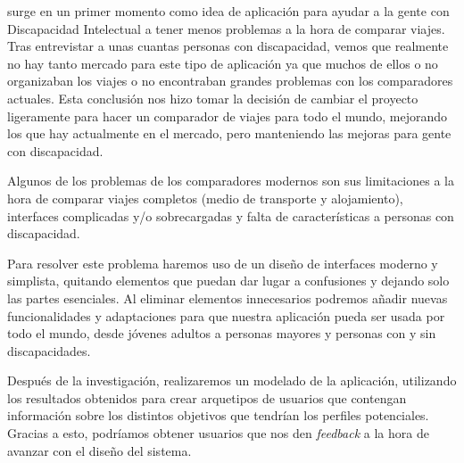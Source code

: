 
\textit{\app} surge en un primer momento como idea de aplicación para ayudar a la gente con Discapacidad Intelectual a tener menos problemas a la hora de comparar viajes.
Tras entrevistar a unas cuantas personas con discapacidad, vemos que realmente no hay tanto mercado para este tipo de aplicación ya que muchos de ellos o no organizaban los viajes o no encontraban grandes problemas con los comparadores actuales.
Esta conclusión nos hizo tomar la decisión de cambiar el proyecto ligeramente para hacer un comparador de viajes para todo el mundo, mejorando los que hay actualmente en el mercado, pero manteniendo las mejoras para gente con discapacidad.

Algunos de los problemas de los comparadores modernos son sus limitaciones a la hora de comparar viajes completos (medio de transporte y alojamiento), interfaces complicadas y/o sobrecargadas y falta de características a personas con discapacidad.

Para resolver este problema haremos uso de un diseño de interfaces moderno y simplista, quitando elementos que puedan dar lugar a confusiones y dejando solo las partes esenciales. Al eliminar elementos innecesarios podremos añadir nuevas funcionalidades y adaptaciones para que nuestra aplicación pueda ser usada por todo el mundo, desde jóvenes adultos a personas mayores y personas con y sin discapacidades.

Después de la investigación, realizaremos un modelado de la aplicación, utilizando los resultados obtenidos para crear arquetipos de usuarios que
contengan información sobre los distintos objetivos que tendrían los perfiles potenciales. Gracias a esto, podríamos obtener usuarios que nos den
\textit{feedback} a la hora de avanzar con el diseño del sistema.
